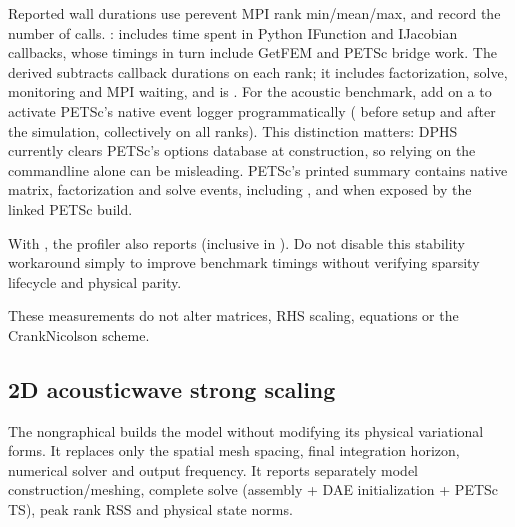 \documentclass[letterpaper,10pt,english]{sphinxmanual}
\begin{document}
\sphinxAtStartPar
Reported wall durations use per\sphinxhyphen{}event MPI rank min/mean/max, and
record the number of calls. :
 includes time spent in Python IFunction
and IJacobian callbacks, whose timings in turn include GetFEM and
PETSc bridge work. The derived 
subtracts callback durations on each rank; it includes factorization,
solve, monitoring and MPI waiting, and is .
For the acoustic benchmark, add  on a  to activate PETSc’s native event logger programmatically
( before setup and  after
the simulation, collectively on all ranks). This distinction matters:
DPHS currently clears PETSc’s options database at construction,
so relying on the command\sphinxhyphen{}line  alone can be misleading.
PETSc’s printed summary contains native matrix, factorization and
solve events, including ,  and
 when exposed by the linked PETSc build.

\sphinxAtStartPar
With , the profiler also
reports  (inclusive in
). Do not disable this stability
workaround simply to improve benchmark timings without verifying
sparsity lifecycle and physical parity.

\sphinxAtStartPar
These measurements do not alter matrices, RHS scaling, equations
or the Crank\textendash{}Nicolson scheme.


\subsection{2D acoustic\sphinxhyphen{}wave strong scaling}
\label{\detokenize{install:d-acoustic-wave-strong-scaling}}
\sphinxAtStartPar
The non\sphinxhyphen{}graphical  builds the
  model without modifying its
physical variational forms. It replaces only the spatial mesh
spacing, final integration horizon, numerical solver and output
frequency. It reports separately model construction/meshing,
complete solve (assembly + DAE initialization + PETSc TS),
peak rank RSS and physical state norms.
\end{document}
